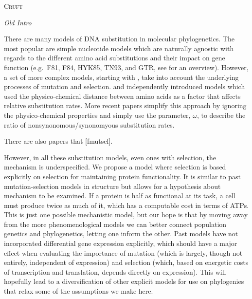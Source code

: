 \documentclass[12pt,letterpaper]{article}
\renewcommand{\section}[1]{%
\bigskip
\begin{center}
\begin{Large}
\normalfont\scshape #1
\medskip
\end{Large}
\end{center}}
\renewcommand{\subsection}[1]{%
\bigskip
\begin{center}
\begin{large}
\normalfont\itshape #1
\end{large}
\end{center}}
\newcommand{\PC}{physico-chemical\xspace}
\newcommand{\includeCruft}{0}%
\begin{document}
\ifthenelse{\includeCruft=1}
{


\pagebreak 

\section{Cruft}
\subsection{Old Intro}
There are many models of DNA substitution in molecular phylogenetics. 
The most popular are simple nucleotide models which are naturally agnostic with regards to the different amino acid substitutions and their impact on gene function (e.g.~F81, F84, HYK85, TN93, and GTR, see \citet{Yang2014} for an overview). 
However, a set of more complex models, starting with \citep{GoldmanAndYang1994,MuseAndGaut1994}, take into account the underlying processes of mutation and selection. 
\citet{GoldmanAndYang1994} and \citet{MuseAndGaut1994} independently introduced models which used the \PC distance between amino acids as a factor that affects relative substitution rates. 
More recent papers simplify this approach by ignoring the \PC properties and simply use the parameter, $\omega$, to describe the ratio of nonsynonomous/synonomyous substitution rates.

There are also papers that [fmutsel].

However, in all these substitution models, even ones with selection, the mechanism is underspecified. We propose a model where selection is based explicitly on selection for maintaining protein functionality.
It is similar to past mutation-selection models in structure but allows for a hypothesis about mechanism to be examined. If a protein is half as functional at its task, a cell must produce twice as much of it, which has a computable cost in terms of ATPs.
This is just one possible mechanistic model, but our hope is that by moving away from the more phenomenological models we can better connect population genetics and phylogenetics, letting one inform the other.
Past models have not incorporated differential gene expression explicitly, which should have a major effect when evaluating the importance of mutation (which is largely, though not entirely, independent of expression) and selection (which, based on energetic costs of transcription and translation, depends directly on expression).
This will hopefully lead to a diversification of other explicit models for use on phylogenies that relax some of the assumptions we make here.

}
\end{document}

